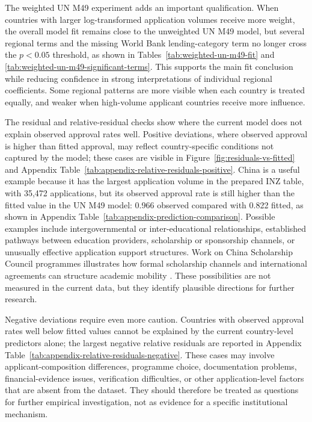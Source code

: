 \documentclass[runningheads]{llncs}
\begin{document}
The weighted UN M49 experiment adds an important qualification. When countries with larger log-transformed application volumes receive more weight, the overall model fit remains close to the unweighted UN M49 model, but several regional terms and the missing World Bank lending-category term no longer cross the $p < 0.05$ threshold, as shown in Tables~\ref{tab:weighted-un-m49-fit} and \ref{tab:weighted-un-m49-significant-terms}. This supports the main fit conclusion while reducing confidence in strong interpretations of individual regional coefficients. Some regional patterns are more visible when each country is treated equally, and weaker when high-volume applicant countries receive more influence.

The residual and relative-residual checks show where the current model does not explain observed approval rates well. Positive deviations, where observed approval is higher than fitted approval, may reflect country-specific conditions not captured by the model; these cases are visible in Figure~\ref{fig:residuals-vs-fitted} and Appendix Table~\ref{tab:appendix-relative-residuals-positive}. China is a useful example because it has the largest application volume in the prepared INZ table, with 35,472 applications, but its observed approval rate is still higher than the fitted value in the UN M49 model: 0.966 observed compared with 0.822 fitted, as shown in Appendix Table~\ref{tab:appendix-prediction-comparison}. Possible examples include intergovernmental or inter-educational relationships, established pathways between education providers, scholarship or sponsorship channels, or unusually effective application support structures. Work on China Scholarship Council programmes illustrates how formal scholarship channels and international agreements can structure academic mobility \cite{Xie2025}. These possibilities are not measured in the current data, but they identify plausible directions for further research.

Negative deviations require even more caution. Countries with observed approval rates well below fitted values cannot be explained by the current country-level predictors alone; the largest negative relative residuals are reported in Appendix Table~\ref{tab:appendix-relative-residuals-negative}. These cases may involve applicant-composition differences, programme choice, documentation problems, financial-evidence issues, verification difficulties, or other application-level factors that are absent from the dataset. They should therefore be treated as questions for further empirical investigation, not as evidence for a specific institutional mechanism.
\end{document}
